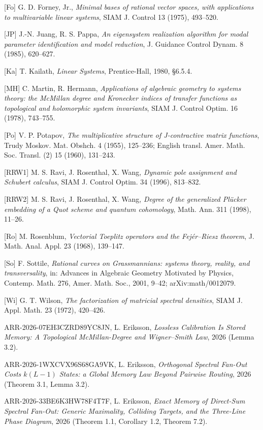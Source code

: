 \documentclass[
  11pt,
  a4paper,
]{article}
\begin{document}
{[}Fo{]} G. D. Forney, Jr., \emph{Minimal bases of rational vector
spaces, with applications to multivariable linear systems}, SIAM J.
Control 13 (1975), 493--520.

{[}JP{]} J.-N. Juang, R. S. Pappa, \emph{An eigensystem realization
algorithm for modal parameter identification and model reduction}, J.
Guidance Control Dynam. 8 (1985), 620--627.

{[}Ka{]} T. Kailath, \emph{Linear Systems}, Prentice-Hall, 1980, §6.5.4.

{[}MH{]} C. Martin, R. Hermann, \emph{Applications of algebraic geometry
to systems theory: the McMillan degree and Kronecker indices of transfer
functions as topological and holomorphic system invariants}, SIAM J.
Control Optim. 16 (1978), 743--755.

{[}Po{]} V. P. Potapov, \emph{The multiplicative structure of
J-contractive matrix functions}, Trudy Moskov. Mat. Obshch. 4 (1955),
125--236; English transl. Amer. Math. Soc. Transl. (2) 15 (1960),
131--243.

{[}RRW1{]} M. S. Ravi, J. Rosenthal, X. Wang, \emph{Dynamic pole
assignment and Schubert calculus}, SIAM J. Control Optim. 34 (1996),
813--832.

{[}RRW2{]} M. S. Ravi, J. Rosenthal, X. Wang, \emph{Degree of the
generalized Plücker embedding of a Quot scheme and quantum cohomology},
Math. Ann. 311 (1998), 11--26.

{[}Ro{]} M. Rosenblum, \emph{Vectorial Toeplitz operators and the
Fejér--Riesz theorem}, J. Math. Anal. Appl. 23 (1968), 139--147.

{[}So{]} F. Sottile, \emph{Rational curves on Grassmannians: systems
theory, reality, and transversality}, in: Advances in Algebraic Geometry
Motivated by Physics, Contemp. Math. 276, Amer. Math. Soc., 2001, 9--42;
arXiv:math/0012079.

{[}Wi{]} G. T. Wilson, \emph{The factorization of matricial spectral
densities}, SIAM J. Appl. Math. 23 (1972), 420--426.

ARR-2026-07EH3CZRD89YC8JN, L. Eriksson, \emph{Lossless Calibration Is
Stored Memory: A Topological McMillan-Degree and Wigner--Smith Law},
2026 (Lemma 3.2).

ARR-2026-1WXCVX96S68GA9VK, L. Eriksson, \emph{Orthogonal Spectral
Fan-Out Costs \(k(L-1)\) States: a Global Memory Law Beyond Pairwise
Routing}, 2026 (Theorem 3.1, Lemma 3.2).

ARR-2026-33BE6K3HW78F4T7F, L. Eriksson, \emph{Exact Memory of Direct-Sum
Spectral Fan-Out: Generic Maximality, Colliding Targets, and the
Three-Line Phase Diagram}, 2026 (Theorem 1.1, Corollary 1.2, Theorem
7.2).
\end{document}
